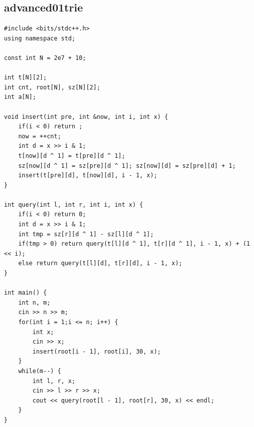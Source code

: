 \documentclass[twoside]{article}
\begin{document}
\subsection{advanced01trie}
\begin{lstlisting}
#include <bits/stdc++.h>
using namespace std;

const int N = 2e7 + 10;

int t[N][2];
int cnt, root[N], sz[N][2];
int a[N];

void insert(int pre, int &now, int i, int x) {
    if(i < 0) return ;
    now = ++cnt;
    int d = x >> i & 1;
    t[now][d ^ 1] = t[pre][d ^ 1]; 
    sz[now][d ^ 1] = sz[pre][d ^ 1]; sz[now][d] = sz[pre][d] + 1;
    insert(t[pre][d], t[now][d], i - 1, x);
}

int query(int l, int r, int i, int x) {
    if(i < 0) return 0;
    int d = x >> i & 1;
    int tmp = sz[r][d ^ 1] - sz[l][d ^ 1];
    if(tmp > 0) return query(t[l][d ^ 1], t[r][d ^ 1], i - 1, x) + (1 << i);
    else return query(t[l][d], t[r][d], i - 1, x);
}

int main() {
    int n, m;
    cin >> n >> m;
    for(int i = 1;i <= n; i++) {
        int x;
        cin >> x;
        insert(root[i - 1], root[i], 30, x);
    }
    while(m--) {
        int l, r, x;
        cin >> l >> r >> x;
        cout << query(root[l - 1], root[r], 30, x) << endl;
    }
}\end{lstlisting}
\end{document}
